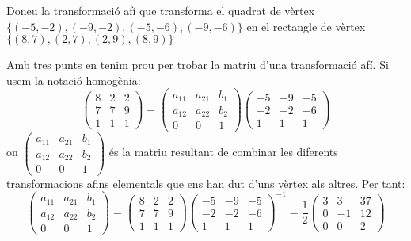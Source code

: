 \Exercise Doneu la transformació afí que transforma el quadrat de vèrtex $\{(-5,-2),(-9,-2),(-5,-6),(-9,-6)\}$ en el rectangle de vèrtex $\{(8,7),(2,7),(2,9),(8,9)\}$

\Answer Amb tres punts en tenim prou per trobar la matriu d'una transformació afí. Si usem la notació homogènia:
\[
\begin{pmatrix}8&2&2\\7&7&9\\1&1&1\end{pmatrix}=
\begin{pmatrix}a_{11}&a_{21}&b_1\\a_{12}&a_{22}&b_2\\0&0&1\end{pmatrix}
\begin{pmatrix}-5&-9&-5\\-2&-2&-6\\1&1&1\end{pmatrix}
\]
on $\begin{pmatrix}a_{11}&a_{21}&b_1\\a_{12}&a_{22}&b_2\\0&0&1\end{pmatrix}$ és la matriu resultant de combinar les diferents transformacions afins elementals que ens han dut d'uns vèrtex als altres. Per tant:
\[
\begin{pmatrix}a_{11}&a_{21}&b_1\\a_{12}&a_{22}&b_2\\0&0&1\end{pmatrix}=
\begin{pmatrix}8&2&2\\7&7&9\\1&1&1\end{pmatrix}
\begin{pmatrix}-5&-9&-5\\-2&-2&-6\\1&1&1\end{pmatrix}^{-1}=
\frac{1}{2}\begin{pmatrix}3&3&37\\0&-1&12\\0&0&2\end{pmatrix}
\]
\blacksquare
